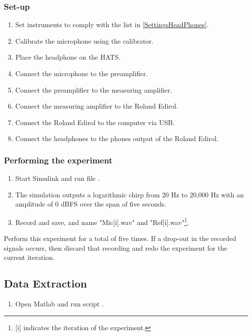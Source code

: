 \subsubsection{Set-up}
\begin{enumerate}
	\item Set instruments to comply with the list in \ref{SettingsHeadPhones}.
	\item Calibrate the microphone using the calibrator.
	\item Place the headphone on the HATS.
	\item Connect the microphone to the preamplifier. 
	\item Connect the preamplifier to the measuring amplifier.
	\item Connect the measuring amplifier to the Roland Edirol. 
	\item Connect the Roland Edirol to the computer via USB.
	\item Connect the headphones to the phones output of the Roland Edirol.
\end{enumerate}

\subsubsection{Performing the experiment}
\begin{enumerate}
	\item Start Simulink and run file  .
	\item The simulation outputs a logarithmic chirp from 20 Hz to 20,000 Hz with an amplitude of 0 dBFS over the span of five seconds.
	\item Record and save, and name "Mic[i].wav" and "Ref[i].wav"\footnote{[i] indicates the iteration of the experiment.}.
\end{enumerate}
Perform this experiment for a total of five times.
If  a drop-out in the recorded signals occurs, then discard that recording and redo the experiment for the current iteration.

\subsection{Data Extraction}
\begin{enumerate}
	\item Open Matlab and run script .
\end{enumerate}

